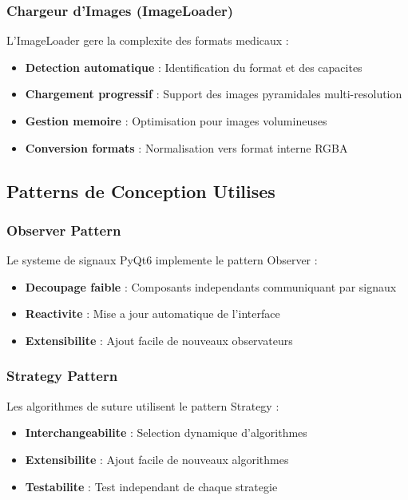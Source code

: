 \documentclass[12pt,a4paper]{article}
\begin{document}
\subsubsection{Chargeur d'Images (ImageLoader)}

L'ImageLoader gere la complexite des formats medicaux :

\begin{itemize}
\item \textbf{Detection automatique} : Identification du format et des capacites
\item \textbf{Chargement progressif} : Support des images pyramidales multi-resolution
\item \textbf{Gestion memoire} : Optimisation pour images volumineuses
\item \textbf{Conversion formats} : Normalisation vers format interne RGBA
\end{itemize}

\subsection{Patterns de Conception Utilises}

\subsubsection{Observer Pattern}

Le systeme de signaux PyQt6 implemente le pattern Observer :

\begin{itemize}
\item \textbf{Decoupage faible} : Composants independants communiquant par signaux
\item \textbf{Reactivite} : Mise a jour automatique de l'interface
\item \textbf{Extensibilite} : Ajout facile de nouveaux observateurs
\end{itemize}

\subsubsection{Strategy Pattern}

Les algorithmes de suture utilisent le pattern Strategy :

\begin{itemize}
\item \textbf{Interchangeabilite} : Selection dynamique d'algorithmes
\item \textbf{Extensibilite} : Ajout facile de nouveaux algorithmes
\item \textbf{Testabilite} : Test independant de chaque strategie
\end{itemize}
\end{document}
